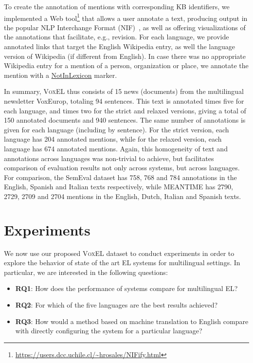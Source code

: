 \documentclass{llncs}
\begin{document}
To create the annotation of mentions with corresponding KB identifiers, we implemented a Web tool\footnote{\url{https://users.dcc.uchile.cl/~hrosales/NIFify.html}} that allows a user annotate a text, producing output in the popular NLP Interchange Format (NIF)~\cite{HellmannLAB13}, as well as offering visualizations of the annotations that facilitate, e.g., revision. For each language, we provide annotated links that target the English Wikipedia entry, as well the language version of Wikipedia (if different from English). In case there was no appropriate Wikipedia entry for a mention of a person, organization or place, we annotate the mention with a \url{NotInLexicon} marker.

In summary, \textsc{VoxEL} thus consists of 15 news (documents) from the multilingual newsletter VoxEurop, totaling 94 sentences. This text is annotated times five for each language, and times two for the strict and relaxed versions, giving a total of 150 annotated documents and 940 sentences. The same number of annotations is given for each language (including by sentence). For the strict version, each language has 204 annotated mentions, while for the relaxed version, each language has 674 annotated mentions. Again, this homogeneity of text and annotations across languages was non-trivial to achieve, but facilitates comparison of evaluation results not only across systems, but across languages. For comparison, the SemEval dataset has 758, 768 and 784 annotations in the English, Spanish and Italian texts respectively, while MEANTIME has 2790, 2729, 2709 and 2704 mentions in the English, Dutch, Italian and Spanish texts.

\section{Experiments}\label{sec:exp}

We now use our proposed \textsc{VoxEL} dataset to conduct experiments in order to explore the behavior of state of the art EL systems for multilingual settings. In particular, we are interested in the following questions:

\begin{itemize}
\item \textbf{RQ1}: How does the performance of systems compare for multilingual EL?
\item \textbf{RQ2}: For which of the five languages are the best results achieved?
\item \textbf{RQ3}: How would a method based on machine translation to English compare with directly configuring the system for a particular language?
\end{itemize}
\end{document}
